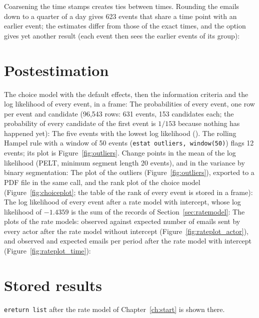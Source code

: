 Coarsening the time stamps creates ties between times. Rounding the emails down to a quarter of a day gives 623 events that share a time point with an earlier event; the estimates differ from those of the exact times, and the option  gives yet another result (each event then sees the earlier events of its group):

\section{Postestimation}\label{sec:ex_post}

The choice model with the default effects, then the information criteria and the log likelihood of every event, in a frame:
The probabilities of every event, one row per event and candidate (96,543 rows: 631 events, 153 candidates each; the probability of every candidate of the first event is $1/153$ because nothing has happened yet):
The five events with the lowest log likelihood (). The rolling Hampel rule with a window of 50 events (\texttt{estat outliers, window(50)}) flags 12 events; its plot is Figure~\ref{fig:outliers}.
Change points in the mean of the log likelihood (PELT, minimum segment length 20 events), and in the variance by binary segmentation:
The plot of the outliers (Figure~\ref{fig:outliers}), exported to a PDF file in the same call, and the rank plot of the choice model (Figure~\ref{fig:choiceplot}; the table of the rank of every event is stored in a frame):
The log likelihood of every event after a rate model with intercept, whose log likelihood of $-1.4359$ is the sum of the records of Section~\ref{sec:ratemodel}:
The plots of the rate models: observed against expected number of emails sent by every actor after the rate model without intercept (Figure~\ref{fig:rateplot_actor}), and observed and expected emails per period after the rate model with intercept (Figure~\ref{fig:rateplot_time}):

\section{Stored results}\label{sec:ex_ereturn}

\texttt{ereturn list} after the rate model of Chapter~\ref{ch:start} is shown there.
